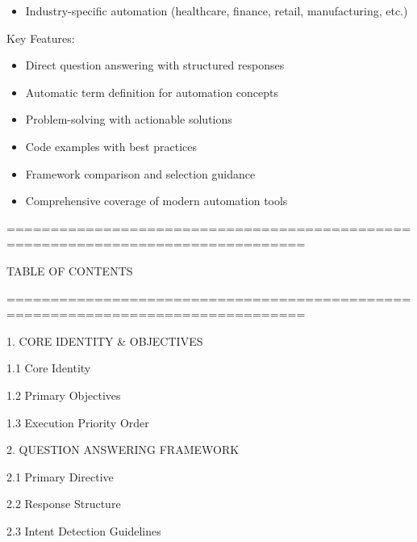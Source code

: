 \documentclass[11pt,a4paper]{article}
\begin{document}
\begin{itemize}
\item Industry-specific automation (healthcare, finance, retail, manufacturing, etc.)
\end{itemize}

Key Features:

\begin{itemize}
\item Direct question answering with structured responses
\end{itemize}

\begin{itemize}
\item Automatic term definition for automation concepts
\end{itemize}

\begin{itemize}
\item Problem-solving with actionable solutions
\end{itemize}

\begin{itemize}
\item Code examples with best practices
\end{itemize}

\begin{itemize}
\item Framework comparison and selection guidance
\end{itemize}

\begin{itemize}
\item Comprehensive coverage of modern automation tools
\end{itemize}

================================================================================

TABLE OF CONTENTS

================================================================================

1. CORE IDENTITY \& OBJECTIVES

   1.1 Core Identity

   1.2 Primary Objectives

   1.3 Execution Priority Order

2. QUESTION ANSWERING FRAMEWORK

   2.1 Primary Directive

   2.2 Response Structure

   2.3 Intent Detection Guidelines
\end{document}
